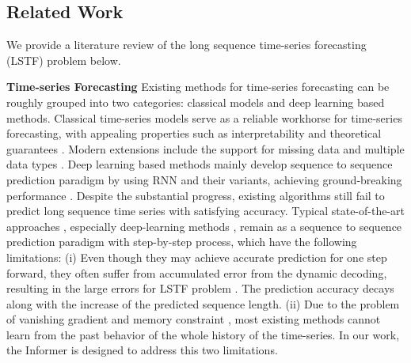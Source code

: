 \documentclass[letterpaper]{article} %
\newcommand{\mn}{Informer}
\begin{document}
\begin{appendices}

\section{Related Work}
\label{sec:appendix.relatedwork}
We provide a literature review of the long sequence time-series forecasting (LSTF) problem below.

\textbf{Time-series Forecasting} Existing methods for time-series forecasting can be roughly grouped into two categories: classical models and deep learning based methods.
Classical time-series models serve as a reliable workhorse for time-series forecasting, with appealing properties such as interpretability and theoretical guarantees \cite{box2015time,ray1990time}.
Modern extensions include the support for missing data \cite{seeger2017approximate} and multiple data types \cite{seeger2016bayesian}.
Deep learning based methods mainly develop sequence to sequence prediction paradigm by using RNN and their variants, achieving ground-breaking performance \cite{hochreiter1997long,li2017graph,yu2017long}.
Despite the substantial progress, existing algorithms still fail to predict long sequence time series with satisfying accuracy. Typical state-of-the-art approaches \cite{seeger2017approximate,seeger2016bayesian}, especially deep-learning methods \cite{yu2017long,conf/ijcai/QinSCCJC17,flunkert2017deepar,mukherjee2018armdn,wen2017multi}, remain as a sequence to sequence prediction paradigm with step-by-step process, which have the following limitations: (i) Even though they may achieve accurate prediction for one step forward, they often suffer from accumulated error from the dynamic decoding, resulting in the large errors for LSTF problem \cite{journals/corr/abs-1904-07464,conf/ijcai/QinSCCJC17}. The prediction accuracy decays along with the increase of the predicted sequence length. (ii) Due to the problem of vanishing gradient and memory constraint \cite{sutskever2014sequence}, most existing methods cannot learn from the past behavior of the whole history of the time-series. In our work, the {\mn} is designed to address this two limitations.


\end{appendices}
\end{document}
